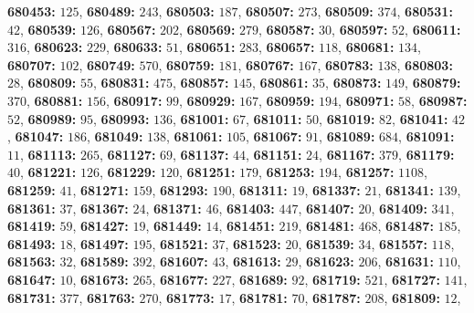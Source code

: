 \textsf{\bfseries 680453:} $125$, \textsf{\bfseries 680489:} $243$, \textsf{\bfseries 680503:} $187$, \textsf{\bfseries 680507:} $273$, \textsf{\bfseries 680509:} $374$, \textsf{\bfseries 680531:} $42$, \textsf{\bfseries 680539:} $126$, \textsf{\bfseries 680567:} $202$, \textsf{\bfseries 680569:} $279$, \textsf{\bfseries 680587:} $30$, \textsf{\bfseries 680597:} $52$, \textsf{\bfseries 680611:} $316$, \textsf{\bfseries 680623:} $229$, \textsf{\bfseries 680633:} $51$, \textsf{\bfseries 680651:} $283$, \textsf{\bfseries 680657:} $118$, \textsf{\bfseries 680681:} $134$, \textsf{\bfseries 680707:} $102$, \textsf{\bfseries 680749:} $570$, \textsf{\bfseries 680759:} $181$, \textsf{\bfseries 680767:} $167$, \textsf{\bfseries 680783:} $138$, \textsf{\bfseries 680803:} $28$, \textsf{\bfseries 680809:} $55$, \textsf{\bfseries 680831:} $475$, \textsf{\bfseries 680857:} $145$, \textsf{\bfseries 680861:} $35$, \textsf{\bfseries 680873:} $149$, \textsf{\bfseries 680879:} $370$, \textsf{\bfseries 680881:} $156$, \textsf{\bfseries 680917:} $99$, \textsf{\bfseries 680929:} $167$, \textsf{\bfseries 680959:} $194$, \textsf{\bfseries 680971:} $58$, \textsf{\bfseries 680987:} $52$, \textsf{\bfseries 680989:} $95$, \textsf{\bfseries 680993:} $136$, \textsf{\bfseries 681001:} $67$, \textsf{\bfseries 681011:} $50$, \textsf{\bfseries 681019:} $82$, \textsf{\bfseries 681041:} $42$, \textsf{\bfseries 681047:} $186$, \textsf{\bfseries 681049:} $138$, \textsf{\bfseries 681061:} $105$, \textsf{\bfseries 681067:} $91$, \textsf{\bfseries 681089:} $684$, \textsf{\bfseries 681091:} $11$, \textsf{\bfseries 681113:} $265$, \textsf{\bfseries 681127:} $69$, \textsf{\bfseries 681137:} $44$, \textsf{\bfseries 681151:} $24$, \textsf{\bfseries 681167:} $379$, \textsf{\bfseries 681179:} $40$, \textsf{\bfseries 681221:} $126$, \textsf{\bfseries 681229:} $120$, \textsf{\bfseries 681251:} $179$, \textsf{\bfseries 681253:} $194$, \textsf{\bfseries 681257:} $1108$, \textsf{\bfseries 681259:} $41$, \textsf{\bfseries 681271:} $159$, \textsf{\bfseries 681293:} $190$, \textsf{\bfseries 681311:} $19$, \textsf{\bfseries 681337:} $21$, \textsf{\bfseries 681341:} $139$, \textsf{\bfseries 681361:} $37$, \textsf{\bfseries 681367:} $24$, \textsf{\bfseries 681371:} $46$, \textsf{\bfseries 681403:} $447$, \textsf{\bfseries 681407:} $20$, \textsf{\bfseries 681409:} $341$, \textsf{\bfseries 681419:} $59$, \textsf{\bfseries 681427:} $19$, \textsf{\bfseries 681449:} $14$, \textsf{\bfseries 681451:} $219$, \textsf{\bfseries 681481:} $468$, \textsf{\bfseries 681487:} $185$, \textsf{\bfseries 681493:} $18$, \textsf{\bfseries 681497:} $195$, \textsf{\bfseries 681521:} $37$, \textsf{\bfseries 681523:} $20$, \textsf{\bfseries 681539:} $34$, \textsf{\bfseries 681557:} $118$, \textsf{\bfseries 681563:} $32$, \textsf{\bfseries 681589:} $392$, \textsf{\bfseries 681607:} $43$, \textsf{\bfseries 681613:} $29$, \textsf{\bfseries 681623:} $206$, \textsf{\bfseries 681631:} $110$, \textsf{\bfseries 681647:} $10$, \textsf{\bfseries 681673:} $265$, \textsf{\bfseries 681677:} $227$, \textsf{\bfseries 681689:} $92$, \textsf{\bfseries 681719:} $521$, \textsf{\bfseries 681727:} $141$, \textsf{\bfseries 681731:} $377$, \textsf{\bfseries 681763:} $270$, \textsf{\bfseries 681773:} $17$, \textsf{\bfseries 681781:} $70$, \textsf{\bfseries 681787:} $208$, \textsf{\bfseries 681809:} $12$, 
